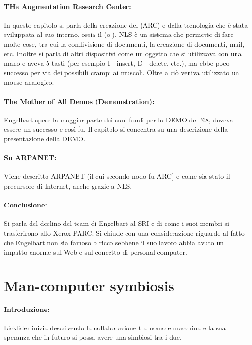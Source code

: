 \paragraph{THe Augmentation Research Center:} In questo capitolo si parla della creazione del  (ARC) e 
della tecnologia che è stata sviluppata al suo interno, ossia il  (o ).
NLS è un sistema che permette di fare molte cose, tra cui la condivisione di documenti, la creazione di documenti, mail, etc.
Inoltre si parla di altri dispositivi come un oggetto che si utilizzava con una mano e aveva 5 tasti (per esempio I - insert, D - delete, etc.), ma ebbe poco successo per via dei
possibili crampi ai muscoli. Oltre a ciò veniva utilizzato un mouse analogico.

\paragraph{The Mother of All Demos (Demonstration):} Engelbart spese la maggior parte dei suoi fondi per la DEMO 
del '68, doveva essere un successo e così fu. Il capitolo si concentra su una descrizione della presentazione della DEMO.

\paragraph{Su ARPANET:} Viene descritto ARPANET (il cui secondo nodo fu ARC) e come sia stato il precursore di Internet, anche grazie a NLS.

\paragraph{Conclusione:} Si parla del declino del team di Engelbart al SRI e di come i suoi membri 
si trasferirono allo Xerox PARC. Si chiude con una considerazione riguardo al fatto che Engelbart non sia
famoso o ricco sebbene il suo lavoro abbia avuto un impatto enorme sul Web e sul concetto di personal computer.

\section{Man-computer symbiosis}

\paragraph{Introduzione:} Licklider inizia descrivendo la collaborazione tra uomo e macchina e la sua speranza che 
in futuro si possa avere una simbiosi tra i due. 

